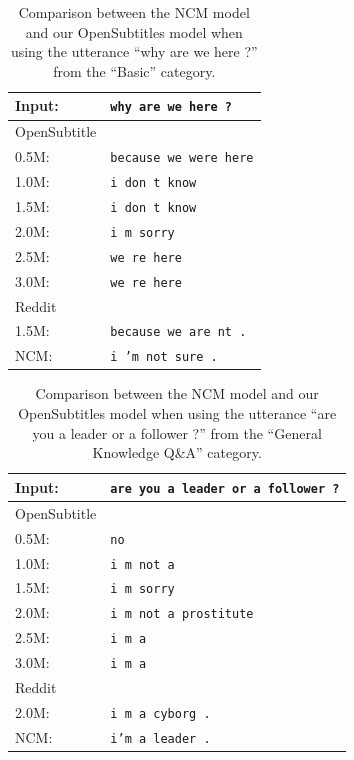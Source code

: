 \begin{table}[H]
	\centering
	\begin{adjustbox}{max width=\textwidth}
		\begin{tabular}{ll}
			\toprule
			Input: 	& \texttt{why are we here ?}\\
			\midrule
			OpenSubtitle\\
			0.5M: 	& \texttt{because we were here}\\
			1.0M: 	& \texttt{i don t know}\\
			1.5M:	& \texttt{i don t know}\\
			2.0M:	& \texttt{i m sorry}\\
			2.5M:	& \texttt{we re here}\\
			3.0M:	& \texttt{we re here}\\
			\midrule
			Reddit\\
			1.5M:	& \texttt{because we are nt .}\\
			\midrule
			NCM:	& \texttt{i ’m not sure .}\\
			\bottomrule
		\end{tabular}
	\end{adjustbox}
	\caption{Comparison between the NCM model and our OpenSubtitles model when using the utterance ``why are we here ?'' from the ``Basic'' category.}
	\label{results:example9_output:Neural_Conversational_Model_compared}
\end{table}
\begin{table}[H]
	\centering
	\begin{adjustbox}{max width=\textwidth}
		\begin{tabular}{ll}
			\toprule
			Input: 	& \texttt{are you a leader or a follower ?}\\
			\midrule
			OpenSubtitle\\
			0.5M: 	& \texttt{no}\\
			1.0M: 	& \texttt{i m not a}\\
			1.5M:	& \texttt{i m sorry}\\
			2.0M:	& \texttt{i m not a prostitute}\\
			2.5M:	& \texttt{i m a}\\
			3.0M:	& \texttt{i m a}\\
			\midrule
			Reddit\\
			2.0M:	& \texttt{i m a cyborg .}\\
			\midrule
			NCM:	& \texttt{i'm a leader .}\\
			\bottomrule
		\end{tabular}
	\end{adjustbox}
	\caption{Comparison between the NCM model and our OpenSubtitles model when using the utterance ``are you a leader or a follower ?'' from the ``General Knowledge Q\&A'' category.}
	\label{results:example10_output:Neural_Conversational_Model_compared}
\end{table}
